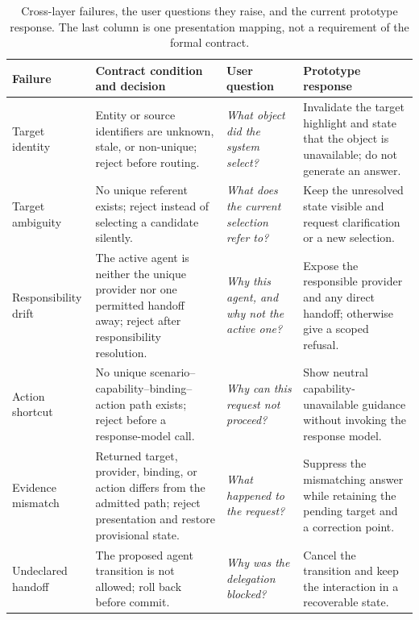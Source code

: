 \begin{table}[t]
  \caption{Cross-layer failures, the user questions they raise, and the current
  prototype response.  The last column is one presentation mapping, not a
  requirement of the formal contract.}
  \label{tab:failure-model}
  \small
  \begin{tabularx}{\textwidth}{@{}p{20mm}Y p{34mm}Y@{}}
    \toprule
    Failure & Contract condition and decision & User question &
    Prototype response \\
    \midrule
    Target identity
      & Entity or source identifiers are unknown, stale, or non-unique; reject
        before routing.
      & \emph{What object did the system select?}
      & Invalidate the target highlight and state that the object is
        unavailable; do not generate an answer. \\
    Target ambiguity
      & No unique referent exists; reject instead of selecting a candidate
        silently.
      & \emph{What does the current selection refer to?}
      & Keep the unresolved state visible and request clarification or a new
        selection. \\
    Responsibility drift
      & The active agent is neither the unique provider nor one permitted
        handoff away; reject after responsibility resolution.
      & \emph{Why this agent, and why not the active one?}
      & Expose the responsible provider and any direct handoff; otherwise give
        a scoped refusal. \\
    Action shortcut
      & No unique scenario--capability--binding--action path exists; reject
        before a response-model call.
      & \emph{Why can this request not proceed?}
      & Show neutral capability-unavailable guidance without invoking the
        response model. \\
    Evidence mismatch
      & Returned target, provider, binding, or action differs from the admitted
        path; reject presentation and restore provisional state.
      & \emph{What happened to the request?}
      & Suppress the mismatching answer while retaining the pending target and
        a correction point. \\
    Undeclared handoff
      & The proposed agent transition is not allowed; roll back before commit.
      & \emph{Why was the delegation blocked?}
      & Cancel the transition and keep the interaction in a recoverable state. \\
    \bottomrule
  \end{tabularx}
\end{table}

